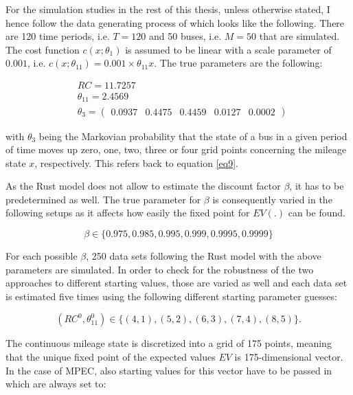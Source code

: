 For the simulation studies in the rest of this thesis, unless otherwise stated, I hence follow the data generating process of \cite{Iskhakov.2016} which looks like the following. There are 120 time periods, i.e. $T=120$ and 50 buses, i.e. $M=50$ that are simulated. The cost function $c(x; \theta_1)$ is assumed to be linear with a scale parameter of $0.001$, i.e. $c(x; \theta_{11}) = 0.001 \times \theta_{11} x$. The true parameters are the following:

\begin{equation*}
	\begin{split}
		& RC = 11.7257 \\
		& \theta_{11} = 2.4569 \\
		& \theta_3 = \begin{pmatrix}
		0.0937 & 0.4475 & 0.4459 & 0.0127 & 0.0002
		\end{pmatrix}
	\end{split}
\end{equation*}

with $\theta_3$ being the Markovian probability that the state of a bus in a given period of time moves up zero, one, two, three or four grid points concerning the mileage state $x$, respectively. This refers back to equation \ref{eq9}.

As the Rust model does not allow to estimate the discount factor $\beta$, it has to be predetermined as well. The true parameter for $\beta$ is consequently varied in the following setups as it affects how easily the fixed point for $EV(.)$ can be found.

\begin{equation*}
	\beta \in \{0.975, 0.985, 0.995, 0.999, 0.9995, 0.9999\}
\end{equation*}

For each possible $\beta$, 250 data sets following the Rust model with the above parameters are simulated. In order to check for the robustness of the two approaches to different starting values, those are varied as well and each data set is estimated five times using the following different starting parameter guesses:

\begin{equation*}
	(RC^0, \theta^0_{11}) \in \{(4,1), (5, 2), (6, 3), (7, 4), (8, 5)\}.
\end{equation*}

The continuous mileage state is discretized into a grid of 175 points, meaning that the unique fixed point of the expected values $EV$ is 175-dimensional vector. In the case of MPEC, also starting values for this vector have to be passed in which are always set to:

